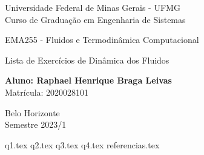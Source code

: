 \documentclass[12pt]{scrartcl}
\begin{document}
\begin{titlepage}
    \begin{center}
        \begin{Large}
            Universidade Federal de Minas Gerais - UFMG\\
            Curso de Graduação em Engenharia de Sistemas\\

            \vspace{5.0cm}


            EMA255 - Fluidos e Termodinâmica Computacional

            \vspace{5.0cm}

            Lista de Exercícios de Dinâmica dos Fluidos
            \vspace*{1cm}

            \textbf{Aluno: Raphael Henrique Braga Leivas}\\
            \vspace*{1cm}
            Matrícula: 2020028101

            \vspace{7cm}

            Belo Horizonte\\
            \vspace*{1cm}
            Semestre 2023/1
        \end{Large}
    \end{center}
\end{titlepage}

\pagestyle{fancy}

\fancyhead{}
\fancyfoot{}

{q1.tex}
{q2.tex}
{q3.tex}
{q4.tex}
{referencias.tex}
\end{document}
